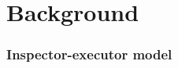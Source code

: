 \chapter{Background}










\subsection{Inspector-executor model}
\cite{knepleyExascaleComputingThreads2015} %

